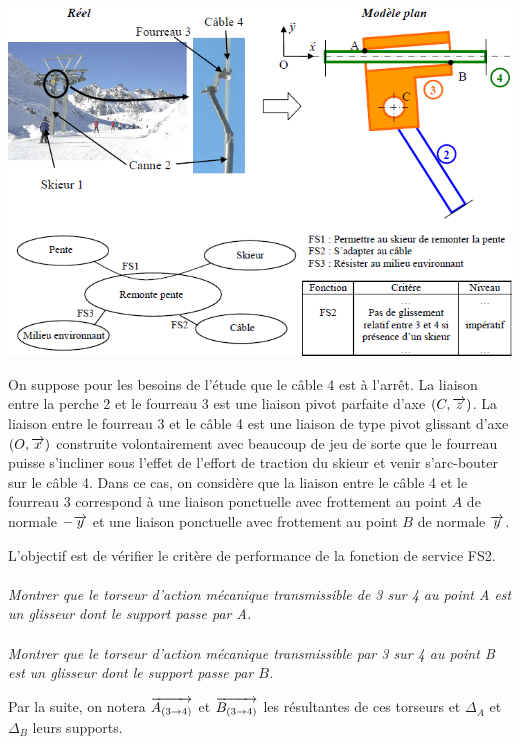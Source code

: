 \documentclass[11pt,oneside]{article}
\begin{document}
\begin{center}
\includegraphics[width=.9\textwidth]{png/img1.png}
\end{center}

On suppose pour les besoins de l'étude que le câble 4 est à l'arrêt. La liaison entre la perche 2 et le fourreau 3 est une liaison pivot parfaite d'axe $(C,\overrightarrow{z})$. La liaison entre le fourreau 3 et le câble 4 est une liaison de type pivot glissant d'axe $(O,\overrightarrow{x})$ construite volontairement avec beaucoup de jeu de sorte que le fourreau puisse s'incliner sous l'effet de l'effort de traction du skieur et venir s'arc-bouter sur le câble 4. Dans ce cas, on considère que la liaison entre le câble 4 et le fourreau 3 correspond à une liaison ponctuelle avec frottement au point $A$ de normale $-\overrightarrow{y}$ et une liaison ponctuelle avec frottement au point $B$ de normale $\overrightarrow{y}$.

L'objectif est de vérifier le critère de performance de la fonction de service FS2. 

\paragraph{}
\textit{Montrer que le torseur d'action mécanique transmissible de 3 sur 4 au point A est un glisseur dont le support passe par A.}

\paragraph{}
\textit{Montrer que le torseur d'action mécanique transmissible par 3 sur 4 au point B est un glisseur dont le support passe par $B$. }

Par la suite, on notera $\overrightarrow{A_{(3\rightarrow 4)}}$ et $\overrightarrow{B_{(3\rightarrow 4)}}$ les résultantes de ces torseurs et $\Delta_A$ et $\Delta_B$ leurs supports.
\end{document}
